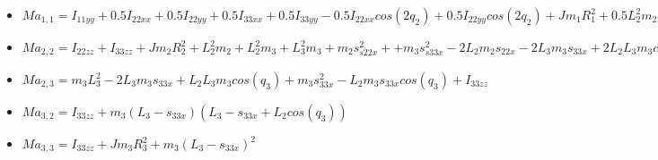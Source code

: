 \begin{itemize}
	\item 
	$Ma_{1,1}= I_{11yy}+0.5I_{22xx}+0.5I_{22yy}+0.5I_{33xx} +0.5I_{33yy} - 			0.5I_{22xx}cos(2q_{2})+ 0.5I_{22yy}cos(2q_2)+Jm_1R_{1}^{2} + 0.5L_{2}^{2}m_{2} +0.5L_{2}^{2}m_{3}+ 0.5L_{3}^{2}m_{3}- 0.5I_{33xx}cos(2q_{2} + 2q_{3}) +0.5I_{33yy}cos(2q_{2} + 2q_{3}) + m_{1}s{11z}^{2} + 0.5m_{2}s_{22x}^{2}+ 0.5m_{3}s_{33x}^{2}+ 0.5m_{2}s_{22x}^{2}cos(2q_{2})+ 0.5L_{3}^{2}m_{3}cos(2q_{2} + 2q_{3})+ 0.5m_{3}s{33x}^{2}cos(2q_{2}+2q_{3}) - 1.0L_{2}m_{2}s_{22x}- 1.0L_{3}m_{3}s_{33x} + 0.5L_{2}^{2}m_{2}cos(2q_{2}+ 0.5L_{2}^{2}m_{3}cos(2q_{2}+L_{2}L_{3}m_{3}cos(q_{3}) -1.0L_{2}m_{3}s_{33x}cos(q_{3})- 1.0L_{3}m_{3}s_{33x}cos(2q_{2} + 2q_{3})+L_{2}L_{3}m_{3}cos(2q_{2} + q_{3})-1.0L_{2}m_{3}s_{33x}cos(2q_{2} + q_{3})-1.0L_{2}m_{2}s_{22x}cos(2q_{2}).$ \\ 
	\vspace{0.2cm}
	
	\item $Ma_{2,2}=I_{22zz}+I_{33zz}+Jm_{2}R_{2}^{2}+L_{2}^{2}m_{2}+L_{2}^{2}m_{3}+L_{3}^{2}m_{3}+m_{2}s_{s22x}^{2}++m_{3}s_{s33x}^{2}- 2L_{2}m_{2}s_{22x}- 2L_{3}m_{3}s_{33x}+ 2L_{2}L_{3}m_{3}cos(q_{3}-2L_{2}m_{3}s_{33x}cos(q_{3})$ \\
	 \vspace{0.2cm}
	
	\item 
	$Ma_{2,3}=m_{3}L_{3}^{2}- 2L_{3}m_{3}s_{33x}+L_{2}L_{3}m_{3}cos(q_{3})+m_{3}s_{33x}^{2}-L_{2}m_{3}s_{33x}cos(q_{3})+I_{33zz}$ \\ \vspace{0.2cm}
	
	\item 
	$Ma_{3,2}=I_{33zz}+m_{3}(L_{3}-s_{33x})(L_{3}-s_{33x}+L_{2}cos(q_{3}))$ \\ 
	\vspace{0.2cm}
	
	\item 
	$Ma_{3,3}=I_{33zz}+Jm_{3}R_{3}^{2}+m_{3}(L_{3}-s_{33x})^{2}$ \\ 
	\vspace{0.2cm}

	
\end{itemize}

